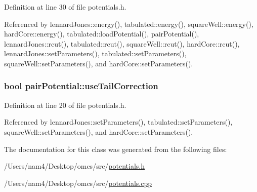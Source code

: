 Definition at line 30 of file potentials.\+h.



Referenced by lennard\+Jones\+::energy(), tabulated\+::energy(), square\+Well\+::energy(), hard\+Core\+::energy(), tabulated\+::load\+Potential(), pair\+Potential(), lennard\+Jones\+::rcut(), tabulated\+::rcut(), square\+Well\+::rcut(), hard\+Core\+::rcut(), lennard\+Jones\+::set\+Parameters(), tabulated\+::set\+Parameters(), square\+Well\+::set\+Parameters(), and hard\+Core\+::set\+Parameters().

\hypertarget{classpair_potential_ab4b4538a7e13771f50a29aaac2443037}{}
\subsubsection[{use\+Tail\+Correction}]{\setlength{\rightskip}{0pt plus 5cm}bool pair\+Potential\+::use\+Tail\+Correction}\label{classpair_potential_ab4b4538a7e13771f50a29aaac2443037}


Definition at line 20 of file potentials.\+h.



Referenced by lennard\+Jones\+::set\+Parameters(), tabulated\+::set\+Parameters(), square\+Well\+::set\+Parameters(), and hard\+Core\+::set\+Parameters().



The documentation for this class was generated from the following files\+:\begin{DoxyCompactItemize}
\item 
/\+Users/nam4/\+Desktop/omcs/src/\hyperlink{potentials_8h}{potentials.\+h}\item 
/\+Users/nam4/\+Desktop/omcs/src/\hyperlink{potentials_8cpp}{potentials.\+cpp}\end{DoxyCompactItemize}
